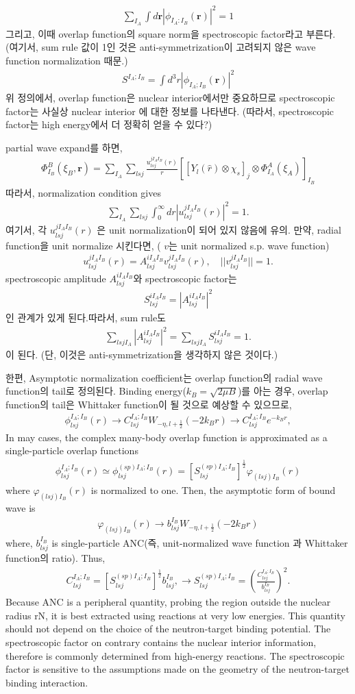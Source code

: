 \documentclass[11pt]{book}
\def\bm{\boldsymbol}
\def\vr{{\bm r}}
\newcommand{\bea}{\begin{eqnarray}}
\newcommand{\eea}{\end{eqnarray}}
\begin{document}
\bea 
\sum_{I_A}\int d\vr |\phi_{I_A:I_B}(\vr)|^2= 1
\eea  
그리고, 이때 overlap function의 square norm을 spectroscopic factor라고 부른다.
(여기서, sum rule 값이 1인 것은 
anti-symmetrization이 고려되지 않은 wave function normalization 때문.)
\bea 
S^{I_A;I_B}=\int d^3 r |\phi_{I_A;I_B}(\vr)|^2
\eea 
위 정의에서, overlap function은 nuclear interior에서만 중요하므로
spectroscopic factor는 사실상 nuclear interior 에 대한 정보를 나타낸다. 
(따라서, spectroscopic factor는 high energy에서 더 정확히 얻을 수 있다?) 

partial wave expand를 하면,
\bea 
\Phi^B_{I_B}(\xi_B,\vr)=\sum_{I_A}\sum_{lsj} \frac{u^{j I_A I_B}_{lsj}(r)}{r}
    \left[ \left[Y_l(\hat{r})\otimes\chi_s\right]_j\otimes \Phi^A_{I_A}(\xi_A) \right]_{I_B}
\eea 
따라서, normalization condition gives
\bea 
\sum_{I_A}\sum_{lsj}\int_0^\infty dr |u^{jI_AI_B}_{lsj}(r)|^2 =1.
\eea 
여기서, 각 $u^{j I_A I_B}_{lsj}(r)$ 은 unit normalization이 되어 있지 않음에 유의. 
만약, radial function을 unit normalize 시킨다면, ( $v$는 unit normalized s.p. wave function)
\bea 
u^{j I_A I_B}_{lsj}(r)=A^{i I_A I_B}_{lsj} v^{j I_A I_B}_{lsj}(r), \quad ||v^{j I_A I_B}_{lsj}||=1.
\eea  
spectroscopic amplitude $A^{i I_A I_B}_{lsj}$와 spectroscopic factor는 
\bea 
S^{i I_A I_B}_{lsj}=|A^{i I_A I_B}_{lsj}|^2
\eea 
인 관계가 있게 된다.따라서, sum rule도 
\bea 
\sum_{lsj I_A}|A^{i I_A I_B}_{lsj}|^2=\sum_{lsj I_A} S^{i I_A I_B}_{lsj}=1.
\eea 
이 된다. (단, 이것은 anti-symmetrization을 생각하지 않은 것이다.)

한편, Asymptotic normalization coefficient는 overlap function의 
radial wave function의 tail로 정의된다. Binding energy($k_B=\sqrt{2\mu B}$)를 아는 경우,
overlap function의 tail은 Whittaker function이 될 것으로 예상할 수 있으므로, 
\bea 
\phi^{I_A;I_B}_{lsj}(r)\to C^{I_A;I_B}_{lsj} 
      W_{-\eta,l+\frac{1}{2}}(-2k_B r)\to C^{I_A;I_B}_{lsj} e^{-k_B r},
\eea 
In may cases, the complex many-body overlap function is approximated as
a single-particle overlap functions
\bea 
\phi^{I_A;I_B}_{lsj}(r)\simeq \phi^{(sp)I_A;I_B}_{lsj}(r)
  = \left[ S_{lsj}^{(sp)I_A;I_B}\right]^{\frac{1}{2}}
    \varphi_{(lsj)I_B}(r)
\eea 
where $\varphi_{(lsj)I_B}(r)$ is normalized to one.
Then, the asymptotic form of bound wave is
\bea 
\varphi_{(lsj)I_B}(r)\to b_{lsj}^{I_B} W_{-\eta,l+\frac{1}{2}}(-2k_B r)
\eea 
where, $b_{lsj}^{I_B}$ is single-particle ANC(즉, unit-normalized wave function
과 Whittaker function의 ratio). Thus, 
\bea 
C^{I_A;I_B}_{lsj} = \left[ S_{lsj}^{(sp)I_A;I_B}\right]^{\frac{1}{2}}b_{lsj}^{I_B},
\to S_{lsj}^{(sp)I_A;I_B}=\left(\frac{ C^{I_A;I_B}_{lsj}}{b_{lsj}^{I_B}}\right)^2.
\eea 
Because ANC is a peripheral quantity, probing the region outside the nuclear radius
rN, it is best extracted using reactions at very low energies. This quantity should not
depend on the choice of the neutron-target binding potential. The spectroscopic factor on
contrary contains the nuclear interior information, therefore is commonly determined from
high-energy reactions. The spectroscopic factor is sensitive to the
assumptions made on the geometry of the neutron-target binding interaction.
\end{document}
